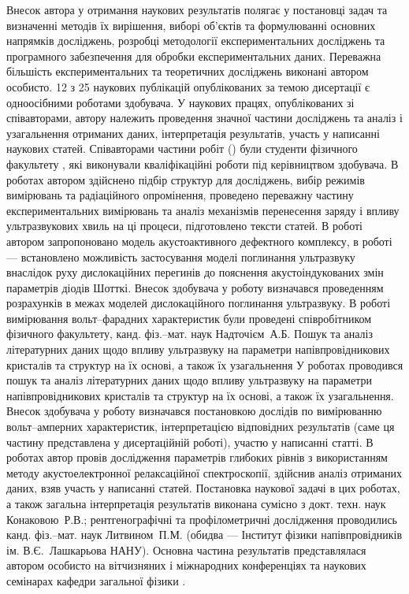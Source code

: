 {\contributionTXT}
Внесок автора у отримання наукових результатів полягає у постановці задач
та визначенні методів їх вирішення, виборі об'єктів та формулюванні
основних напрямків досліджень,
розробці методології експериментальних досліджень та програмного забезпечення для обробки експериментальних даних.
Переважна більшість експериментальних та теоретичних досліджень виконані автором особисто.
12 з 25 наукових публікацій опублікованих за темою дисертації є одноосібними роботами здобувача.
У наукових працях, опублікованих зі співавторами, автору належить проведення значної частини досліджень та аналіз і узагальнення отриманих
даних, інтерпретація результатів, участь у написанні наукових статей.
Співавторами частини робіт (\cite{Olikh2018JAP,Olikh:Ultras2016,Olikh2016JSem,OlikhJAP,Olikh:PZTF2006}) були студенти фізичного факультету \thesisOfOrganization,
які виконували кваліфікаційні роботи під керівництвом здобувача.
В роботах \cite{Olikh2018JAP,Olikh:Ultras2016,Olikh2016JSem,OlikhJAP,Olikh:SEMT2007,Olikh:MRS2007a,Olikh:PZTF2006} автором здійснено підбір структур для досліджень, вибір режимів вимірювань та радіаційного опромінення,
проведено переважну частину експериментальних вимірювань та аналіз механізмів перенесення заряду і впливу ультразвукових хвиль на ці процеси,
підготовлено тексти статей.
В роботі \cite{Olikh2018JAP} автором запропоновано модель акустоактивного дефектного комплексу,
в роботі \cite{Olikh:Ultras2016} --- встановлено можливість застосування моделі поглинання ультразвуку внаслідок руху дислокаційних перегинів до пояснення акустоіндукованих змін параметрів діодів Шотткі.
Внесок здобувача у роботу \cite{Olikh:UPJ2014} визначався проведенням розрахунків в межах моделей дислокаційного поглинання ультразвуку.
В роботі \cite{Olikh:UPJ2013} вимірювання вольт--фарадних характеристик були проведені співробітником фізичного факультету, канд. фіз.--мат. наук Надточієм~А.\:Б.
Пошук та аналіз літературних даних щодо впливу ультразвуку на параметри напівпровідникових кристалів та структур на їх основі, а також їх узагальнення
У роботах \cite{Olikh:SEMT2004,Olikh:SEMT2011} проводився пошук та аналіз літературних даних щодо впливу ультразвуку на параметри напівпровідникових кристалів та структур на їх основі, а також їх узагальнення.
Внесок здобувача у роботу \cite{Gorb2010} визначався постановкою дослідів по вимірюванню вольт--амперних характеристик,
інтерпретацією відповідних результатів (саме ця частину представлена у дисертаційній роботі), участю у написанні статті.
В роботах \cite{Olikh:PhChOM2005,Olikh:PJE2004} автор провів дослідження параметрів глибоких рівнів з використанням методу акустоелектронної релаксаційної спектроскопії,
здійснив аналіз отриманих даних, взяв участь у написанні статей.
Постановка наукової задачі в цих роботах, а також загальна інтерпретація результатів виконана сумісно з докт. техн. наук Конаковою~Р.\:В.;
рентгенографічні та профілометричні дослідження проводились канд. фіз.--мат. наук Литвином~П.\:М.  (обидва --- Інститут фізики напівпровідників ім. В.\:Є.~Лашкарьова НАНУ).
Основна частина результатів
представлялася автором особисто на вітчизняних і міжнародних конференціях
та наукових семінарах кафедри загальної фізики \thesisOfOrganization.







